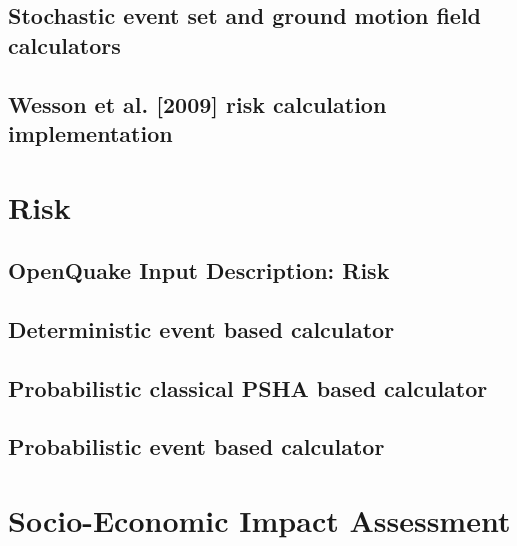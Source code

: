 \documentclass[12pt,a4paper,headings=small,version=first,dvips]{scrbook}
\begin{document}
\chapter{Stochastic event set and ground motion field calculators}
	
\chapter{Wesson et al. [2009] risk calculation implementation}
	
\part{Risk}
\chapter{OpenQuake Input Description: Risk}
	
\chapter{Deterministic event based calculator}
	
\chapter{Probabilistic classical PSHA based calculator}
	
\chapter{Probabilistic event based calculator}
	
\part{Socio-Economic Impact Assessment}
	
\end{document}
